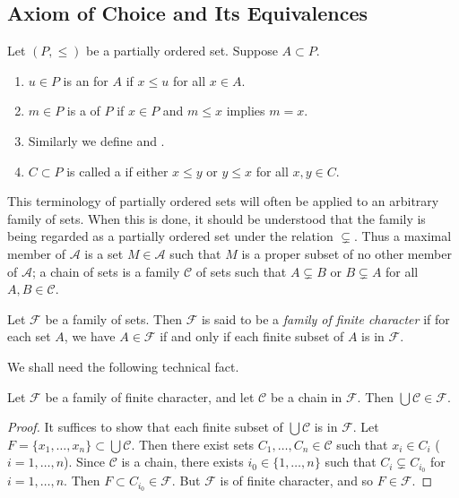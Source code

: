 \subsection{Axiom of Choice and Its Equivalences}
\begin{definition}
Let $(P,\le)$ be a partially ordered set. Suppose $A\subset P$.
\begin{enumerate}[label=(\roman*)]
\item $u\in P$ is an  for $A$ if $x\le u$ for all $x\in A$.
\item $m\in P$ is a  of $P$ if $x\in P$ and $m\le x$ implies $m=x$.
\item Similarly we define  and .
\item $C\subset P$ is called a  if either $x\le y$ or $y\le x$ for all $x,y\in C$.
\end{enumerate}
\end{definition}

This terminology of partially ordered sets will often be applied to an arbitrary family of sets. When this is done, it should be understood that the family is being regarded as a partially ordered set under the relation $\subsetneq$. Thus a maximal member of $\mathscr{A}$ is a set $M\in\mathscr{A}$ such that $M$ is a proper subset of no other member of $\mathscr{A}$; a chain of sets is a family $\mathscr{C}$ of sets such that $A\subsetneq B$ or $B\subsetneq A$ for all $A,B\in\mathscr{C}$.

\begin{definition}
Let $\mathscr{F}$ be a family of sets. Then $\mathscr{F}$ is said to be a \emph{family of finite character} if for each set $A$, we have $A\in\mathscr{F}$ if and only if each finite subset of $A$ is in $\mathscr{F}$.
\end{definition}

We shall need the following technical fact.

\begin{lemma}
Let $\mathscr{F}$ be a family of finite character, and let $\mathscr{C}$ be a chain in $\mathscr{F}$. Then $\bigcup\mathscr{C}\in\mathscr{F}$.
\end{lemma}

\begin{proof}
It suffices to show that each finite subset of $\bigcup\mathscr{C}$ is in $\mathscr{F}$. Let $F=\{x_1,\dots,x_n\}\subset\bigcup\mathscr{C}$. Then there exist sets $C_1,\dots,C_n\in\mathscr{C}$ such that $x_i\in C_i$ ($i=1,\dots,n$). Since $\mathscr{C}$ is a chain, there exists $i_0\in\{1,\dots,n\}$ such that $C_i\subsetneq C_{i_0}$ for $i=1,\dots,n$. Then $F\subset C_{i_0}\in\mathscr{F}$. But $\mathscr{F}$ is of finite character, and so $F\in\mathscr{F}$.
\end{proof}

